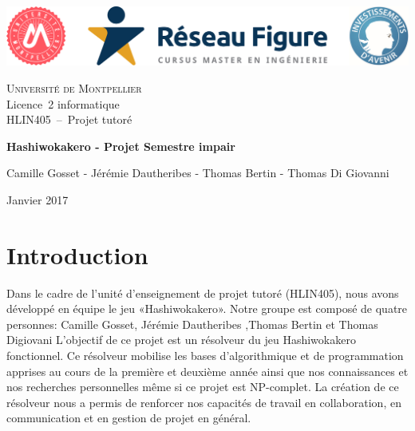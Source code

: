 \documentclass{article}
\begin{document}
\begin{titlepage}
  \begin{center}
    \includegraphics[scale=0.45]{logos.png}
    \vspace{1.5cm}
    
    \textsc{\LARGE Université de Montpellier}\\
    Licence~2 informatique\\
    HLIN405~--~Projet tutoré
    
    \vfill
    

 
    { \huge \bfseries Hashiwokakero - Projet Semestre impair \\[0.4cm] }

    \HRule
    \vfill
    
    
    \vfill

    \begin{minipage}{0.9\textwidth}

        Camille Gosset - Jérémie Dautheribes - Thomas Bertin - Thomas Di Giovanni
      
    \end{minipage}

    \vfill

    {\large Janvier 2017}
  \end{center}
\end{titlepage}



\section{\LARGE Introduction}
\hspace{0.5cm} Dans le cadre de l'unité d'enseignement de projet tutoré (HLIN405), nous avons développé en équipe le jeu «Hashiwokakero». Notre groupe est composé de quatre personnes: Camille Gosset, Jérémie Dautheribes ,Thomas Bertin et Thomas Digiovani
L’objectif de ce projet est un résolveur du jeu Hashiwokakero fonctionnel. Ce résolveur mobilise les bases d’algorithmique et de programmation apprises au cours de la première et deuxième année ainsi que nos connaissances et nos recherches personnelles même si ce projet est NP-complet. La création de ce résolveur nous a permis de renforcer nos capacités de travail en collaboration, en communication et en gestion de projet en général.
\end{document}
